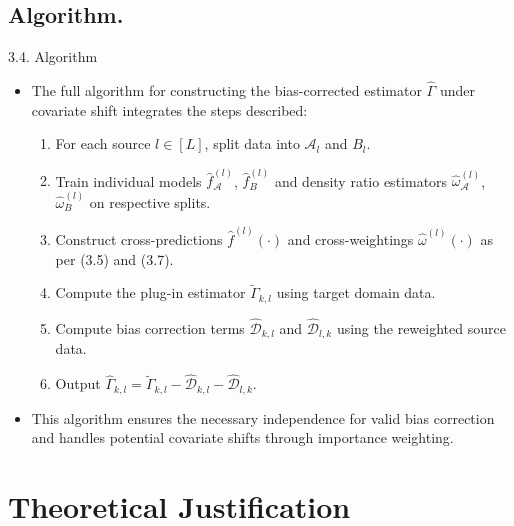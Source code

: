 \documentclass{beamer}
\begin{document}
\subsection{Algorithm.}

\begin{frame}{3.4. Algorithm}
    \begin{itemize}
        \item The full algorithm for constructing the bias-corrected estimator $\widehat{\Gamma}$ under covariate shift integrates the steps described:
        \begin{enumerate}
            \item For each source $l \in [L]$, split data into $\mathcal{A}_l$ and $B_l$.
            \item Train individual models $\widehat{f}_{\mathcal{A}}^{(l)}$, $\widehat{f}_{B}^{(l)}$ and density ratio estimators $\widehat{\omega}_{\mathcal{A}}^{(l)}$, $\widehat{\omega}_{B}^{(l)}$ on respective splits.
            \item Construct cross-predictions $\widehat{f}^{(l)}(\cdot)$ and cross-weightings $\widehat{\omega}^{(l)}(\cdot)$ as per (3.5) and (3.7).
            \item Compute the plug-in estimator $\widetilde{\Gamma}_{k,l}$ using target domain data.
            \item Compute bias correction terms $\widehat{\mathcal{D}}_{k,l}$ and $\widehat{\mathcal{D}}_{l,k}$ using the reweighted source data.
            \item Output $\widehat{\Gamma}_{k,l} = \widetilde{\Gamma}_{k,l} - \widehat{\mathcal{D}}_{k,l} - \widehat{\mathcal{D}}_{l,k}$.
        \end{enumerate}
        \item This algorithm ensures the necessary independence for valid bias correction and handles potential covariate shifts through importance weighting.
    \end{itemize}
\end{frame}
\section{Theoretical Justification}
\end{document}
